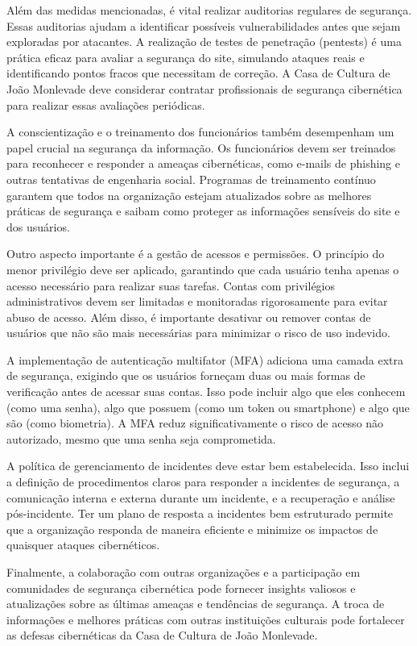 Além das medidas mencionadas, é vital realizar auditorias regulares de segurança. Essas auditorias ajudam a identificar possíveis vulnerabilidades antes que sejam exploradas por atacantes. A realização de testes de penetração (pentests) é uma prática eficaz para avaliar a segurança do site, simulando ataques reais e identificando pontos fracos que necessitam de correção. A Casa de Cultura de João Monlevade deve considerar contratar profissionais de segurança cibernética para realizar essas avaliações periódicas.

A conscientização e o treinamento dos funcionários também desempenham um papel crucial na segurança da informação. Os funcionários devem ser treinados para reconhecer e responder a ameaças cibernéticas, como e-mails de phishing e outras tentativas de engenharia social. Programas de treinamento contínuo garantem que todos na organização estejam atualizados sobre as melhores práticas de segurança e saibam como proteger as informações sensíveis do site e dos usuários.

Outro aspecto importante é a gestão de acessos e permissões. O princípio do menor privilégio deve ser aplicado, garantindo que cada usuário tenha apenas o acesso necessário para realizar suas tarefas. Contas com privilégios administrativos devem ser limitadas e monitoradas rigorosamente para evitar abuso de acesso. Além disso, é importante desativar ou remover contas de usuários que não são mais necessárias para minimizar o risco de uso indevido.

A implementação de autenticação multifator (MFA) adiciona uma camada extra de segurança, exigindo que os usuários forneçam duas ou mais formas de verificação antes de acessar suas contas. Isso pode incluir algo que eles conhecem (como uma senha), algo que possuem (como um token ou smartphone) e algo que são (como biometria). A MFA reduz significativamente o risco de acesso não autorizado, mesmo que uma senha seja comprometida.

A política de gerenciamento de incidentes deve estar bem estabelecida. Isso inclui a definição de procedimentos claros para responder a incidentes de segurança, a comunicação interna e externa durante um incidente, e a recuperação e análise pós-incidente. Ter um plano de resposta a incidentes bem estruturado permite que a organização responda de maneira eficiente e minimize os impactos de quaisquer ataques cibernéticos.

Finalmente, a colaboração com outras organizações e a participação em comunidades de segurança cibernética pode fornecer insights valiosos e atualizações sobre as últimas ameaças e tendências de segurança. A troca de informações e melhores práticas com outras instituições culturais pode fortalecer as defesas cibernéticas da Casa de Cultura de João Monlevade.

